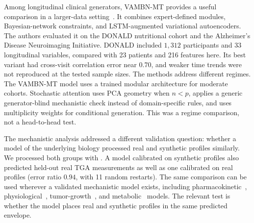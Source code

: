 Among longitudinal clinical generators, VAMBN-MT provides a useful comparison in a
larger-data setting~\citep{Kuhnel2024}. It combines
expert-defined modules, Bayesian-network constraints, and LSTM-augmented variational
autoencoders. The authors evaluated it on the DONALD nutritional cohort and the Alzheimer's
Disease Neuroimaging Initiative. DONALD included $1{,}312$ participants and 33 longitudinal
variables, compared with 23 patients and 216 features here. Its best variant had cross-visit
correlation error near 0.70, and weaker time trends were not reproduced at the tested sample
sizes. The methods address different regimes. The VAMBN-MT model uses a trained modular architecture
for moderate cohorts. Stochastic attention uses PCA geometry when $n<p$, applies a generic
generator-blind mechanistic check instead of domain-specific rules, and uses multiplicity
weights for conditional generation. This was a regime comparison, not a head-to-head test.

The mechanistic analysis addressed a different validation question: whether a model of the
underlying biology processed real and synthetic profiles similarly. We processed both groups
with . A model calibrated on synthetic profiles also
predicted held-out real TGA measurements as well as one calibrated on real profiles (error
ratio $0.94$, with 11 random restarts). The same comparison can be used wherever a validated
mechanistic model exists, including pharmacokinetic~\citep{MouldUpton2013},
physiological~\citep{Chase2011}, tumor-growth~\citep{Ribba2012}, and
metabolic~\citep{Yizhak2015,Shan2018} models. The relevant test is whether the model places
real and synthetic profiles in the same predicted envelope.

